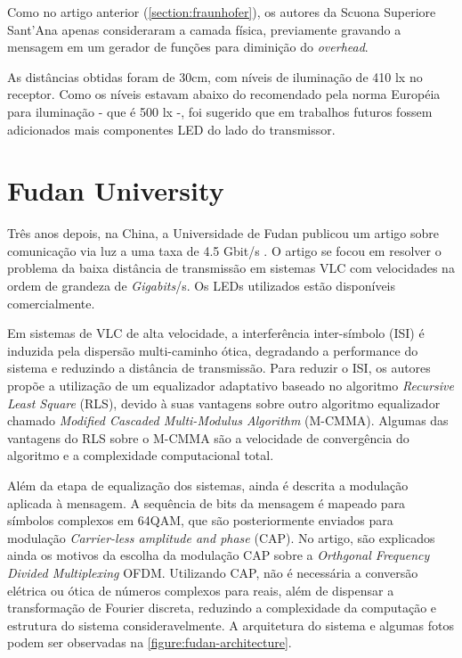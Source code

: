 	Como no artigo anterior (\autoref{section:fraunhofer}), os autores da Scuona Superiore Sant’Ana apenas consideraram a camada física, previamente gravando a mensagem em um gerador de funções para diminição do \textit{overhead}. 
	
	As distâncias obtidas foram de 30cm, com níveis de iluminação de 410 lx no receptor. Como os níveis estavam abaixo do recomendado pela norma Européia para iluminação - que é 500 lx -, foi sugerido que em trabalhos futuros fossem adicionados mais componentes LED do lado do transmissor.
	
	\section{Fudan University}\label{section:fudan-u}
	
	Três anos depois, na China, a Universidade de Fudan publicou um artigo sobre comunicação via luz a uma taxa de 4.5 Gbit/s \cite{4.5g-fudan}. O artigo se focou em resolver o problema da baixa distância de transmissão em sistemas VLC com velocidades na ordem de grandeza de \textit{Gigabits}/s. Os LEDs utilizados estão disponíveis comercialmente.
	
	Em sistemas de VLC de alta velocidade, a interferência inter-símbolo (ISI) é induzida pela dispersão multi-caminho ótica, degradando a performance do sistema e reduzindo a distância de transmissão. Para reduzir o ISI, os autores propõe a utilização de um equalizador adaptativo baseado no algoritmo \textit{Recursive Least Square} (RLS), devido à suas vantagens sobre outro algoritmo equalizador chamado \textit{Modified Cascaded Multi-Modulus Algorithm} (M-CMMA). Algumas das vantagens do RLS sobre o M-CMMA são a velocidade de convergência do algoritmo e a complexidade computacional total.
	
	Além da etapa de equalização dos sistemas, ainda é descrita a modulação aplicada à mensagem. A sequência de bits da mensagem é mapeado para símbolos complexos em 64QAM, que são posteriormente enviados para modulação \textit{Carrier-less amplitude and phase} (CAP). No artigo, são explicados ainda os motivos da escolha da modulação CAP sobre a \textit{Orthgonal Frequency Divided Multiplexing} OFDM. Utilizando CAP, não é necessária a conversão elétrica ou ótica de números complexos para reais, além de dispensar a transformação de Fourier discreta, reduzindo a complexidade da computação e estrutura do sistema consideravelmente. A arquitetura do sistema e algumas fotos podem ser observadas na \autoref{figure:fudan-architecture}.
	
